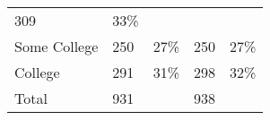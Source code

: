 \documentclass[11pt]{article}
\begin{document}
\begin{longtable}[]{@{}lllll@{}}
\begin{minipage}[t]{0.15\columnwidth}
309\strut
\end{minipage} & \begin{minipage}[t]{0.13\columnwidth}\raggedright
33\%\strut
\end{minipage}\tabularnewline
\begin{minipage}[t]{0.21\columnwidth}\raggedright
Some College\strut
\end{minipage} & \begin{minipage}[t]{0.23\columnwidth}\raggedright
250\strut
\end{minipage} & \begin{minipage}[t]{0.15\columnwidth}\raggedright
27\%\strut
\end{minipage} & \begin{minipage}[t]{0.15\columnwidth}\raggedright
250\strut
\end{minipage} & \begin{minipage}[t]{0.13\columnwidth}\raggedright
27\%\strut
\end{minipage}\tabularnewline
\begin{minipage}[t]{0.21\columnwidth}\raggedright
College\strut
\end{minipage} & \begin{minipage}[t]{0.23\columnwidth}\raggedright
291\strut
\end{minipage} & \begin{minipage}[t]{0.15\columnwidth}\raggedright
31\%\strut
\end{minipage} & \begin{minipage}[t]{0.15\columnwidth}\raggedright
298\strut
\end{minipage} & \begin{minipage}[t]{0.13\columnwidth}\raggedright
32\%\strut
\end{minipage}\tabularnewline
\begin{minipage}[t]{0.21\columnwidth}\raggedright
Total\strut
\end{minipage} & \begin{minipage}[t]{0.23\columnwidth}\raggedright
931\strut
\end{minipage} & \begin{minipage}[t]{0.15\columnwidth}\raggedright
\strut
\end{minipage} & \begin{minipage}[t]{0.15\columnwidth}\raggedright
938\strut
\end{minipage} & \begin{minipage}[t]{0.13\columnwidth}\raggedright
\strut
\end{minipage}\tabularnewline
\bottomrule
\end{longtable}
\end{document}
